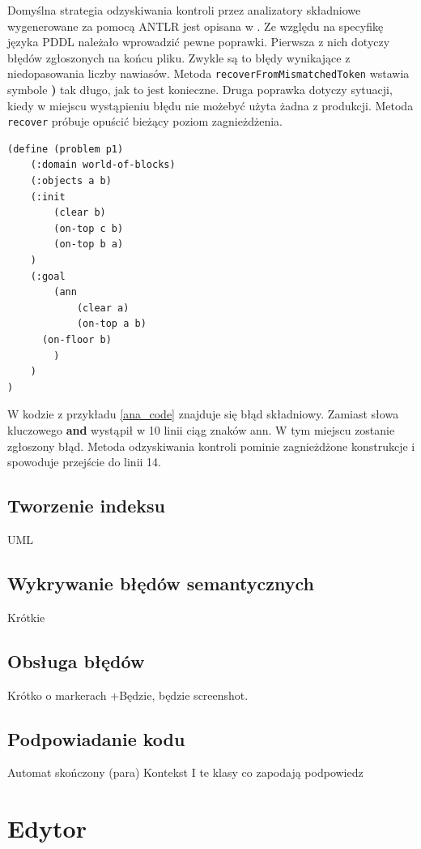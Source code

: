 Domyślna strategia odzyskiwania kontroli przez analizatory składniowe wygenerowane 
za pomocą ANTLR jest opisana w \cite{antlr}. Ze względu na specyfikę języka PDDL
należało wprowadzić pewne poprawki. Pierwsza z nich dotyczy błędów zgłoszonych na końcu pliku.
Zwykle są to błędy wynikające z niedopasowania liczby nawiasów.
Metoda \texttt{recoverFromMismatchedToken} wstawia symbole \textbf{)} tak długo, jak to jest konieczne.
Druga poprawka dotyczy sytuacji, kiedy w miejscu wystąpieniu błędu nie możebyć użyta żadna
z produkcji. Metoda \texttt{recover} próbuje opuścić bieżący poziom zagnieżdżenia.

\begin{Code}
\begin{lstlisting}[language=LISP,frame=single,label=ana_code, caption=Kod PDDL zawierający błąd składniowy]
(define (problem p1)
	(:domain world-of-blocks)
	(:objects a b)
	(:init
		(clear b)
		(on-top c b)
		(on-top b a)
	)
	(:goal
		(ann
			(clear a)
			(on-top a b)
      (on-floor b)
		)
	)
)
\end{lstlisting}
\end{Code}

W kodzie z przykładu \ref{ana_code} znajduje się błąd składniowy. Zamiast słowa kluczowego \textbf{and}
wystąpił w 10 linii ciąg znaków ann. W tym miejscu zostanie zgłoszony błąd. Metoda odzyskiwania kontroli
pominie zagnieżdżone konstrukcje i spowoduje przejście do linii 14.

\subsection{Tworzenie indeksu}
UML

\subsection{Wykrywanie błędów semantycznych}
Krótkie

\subsection{Obsługa błędów}
Krótko o markerach
+Będzie, będzie screenshot.


\subsection{Podpowiadanie kodu}
Automat skończony (para)
Kontekst
I te klasy co zapodają podpowiedz

\section{Edytor}
